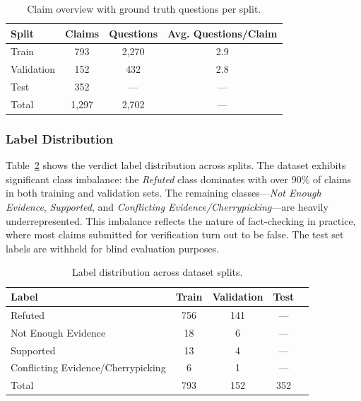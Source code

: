 \begin{table}[ht]
\centering
\caption{Claim overview with ground truth questions per split.}
\label{tab:dataset_stats}
\begin{tabular}{lccc}
\hline
\textbf{Split} & \textbf{Claims} & \textbf{Questions} & \textbf{Avg. Questions/Claim} \\
\hline
Train      & 793 & 2,270 & 2.9 \\
Validation & 152 & 432   & 2.8 \\
Test       & 352 & ---   & --- \\
\hline
Total      & 1,297 & 2,702 & --- \\
\hline
\end{tabular}
\end{table}

\subsubsection{Label Distribution}

Table~\ref{tab:label_dist} shows the verdict label distribution across splits. The dataset exhibits significant class imbalance: the \textit{Refuted} class dominates with over 90\% of claims in both training and validation sets. The remaining classes---\textit{Not Enough Evidence}, \textit{Supported}, and \textit{Conflicting Evidence/Cherrypicking}---are heavily underrepresented. This imbalance reflects the nature of fact-checking in practice, where most claims submitted for verification turn out to be false. The test set labels are withheld for blind evaluation purposes.

\begin{table}[ht]
\centering
\caption{Label distribution across dataset splits.}
\label{tab:label_dist}
\begin{tabular}{lcccc}
\hline
\textbf{Label} & \textbf{Train} & \textbf{Validation} & \textbf{Test} \\
\hline
Refuted                              & 756 & 141 & --- \\
Not Enough Evidence                  & 18  & 6   & --- \\
Supported                            & 13  & 4   & --- \\
Conflicting Evidence/Cherrypicking   & 6   & 1   & --- \\
\hline
Total                                & 793 & 152 & 352 \\
\hline
\end{tabular}
\end{table}

